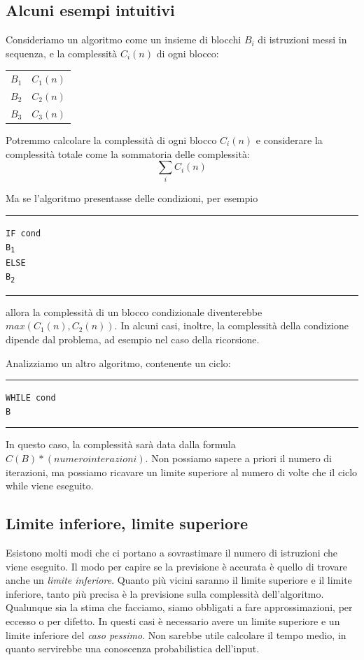 \documentclass[a4paper,12pt,twoside]{report}
\newcommand\pseudo[1]{\setlength\parindent{0pt}\texttt{#1}\setlength\parindent{24pt} \\}
\newcommand\hlin{\noindent\rule[0.5ex]{\linewidth}{1pt}}
\begin{document}
\subsection{Alcuni esempi intuitivi}
Consideriamo un algoritmo come un insieme di blocchi $B_i$ di istruzioni messi in sequenza, e la complessit\`{a} $C_i(n)$ di ogni blocco:
\begin{center}
\begin{tabular}{c|c}
$B_1$ & $C_1(n)$ \\
$B_2$ & $C_2(n)$ \\
$B_3$ & $C_3(n)$ \\
\end{tabular}
\end{center}
Potremmo calcolare la complessit\`{a} di ogni blocco $C_i(n)$ e considerare la 
complessit\`{a} totale come la sommatoria delle complessit\`{a}:
\[ \sum_{i} C_i(n) \]

Ma se l'algoritmo presentasse delle condizioni, per esempio

\hlin

\pseudo{IF cond}
\texttt{\indent B\textsubscript{1} \\
ELSE \\
\indent B\textsubscript{2} \\
}
\hlin

\noindent allora la complessit\`{a} di un blocco condizionale diventerebbe $max(C_1(n), C_2(n))$.
In alcuni casi, inoltre, la complessit\`{a} della condizione dipende dal problema, ad 
esempio nel caso della ricorsione.

Analizziamo un altro algoritmo, contenente un ciclo:

\hlin

\pseudo{WHILE cond}
\texttt{\indent B}

\hlin

\noindent In questo caso, la complessit\`{a} sar\`{a} data dalla formula $C(B) * (numero interazioni)$. Non possiamo sapere a priori il numero di iterazioni, ma possiamo ricavare un limite superiore al numero di volte che il ciclo while viene eseguito.
\subsection{Limite inferiore, limite superiore}
Esistono molti modi che ci portano a sovrastimare il numero di istruzioni che viene 
eseguito. Il modo per capire se la previsione \`{e} accurata \`{e} quello di trovare
anche un \emph{limite inferiore}. Quanto pi\`{u} vicini saranno il limite superiore e
il limite inferiore, tanto pi\`{u} precisa \`{e} la previsione sulla complessit\`{a} 
dell'algoritmo. 
Qualunque sia la stima che facciamo, siamo obbligati a fare approssimazioni, per 
eccesso o per difetto. In questi casi \`{e} necessario avere un limite superiore e un 
limite inferiore del \emph{caso pessimo}. Non sarebbe utile calcolare il tempo medio, 
in quanto servirebbe una conoscenza probabilistica dell'input.
\end{document}
